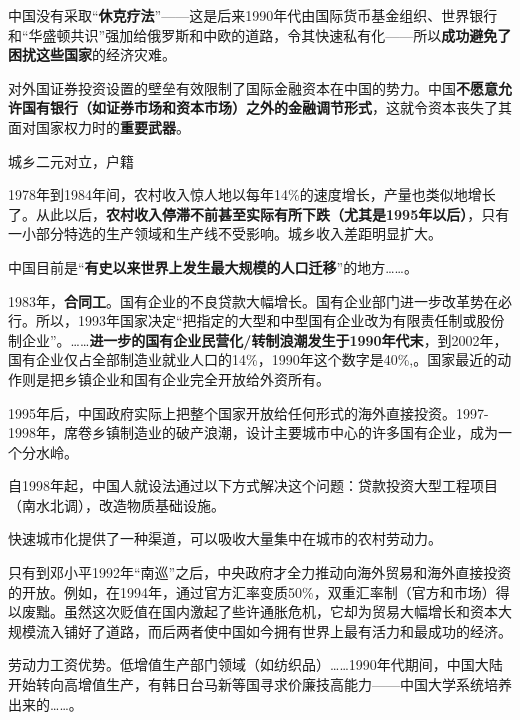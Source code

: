  中国没有采取“\textbf{休克疗法}”——这是后来1990年代由国际货币基金组织、世界银行和“华盛顿共识”强加给俄罗斯和中欧的道路，令其快速私有化——所以\textbf{成功避免了困扰这些国家}的经济灾难。

 对外国证券投资设置的壁垒有效限制了国际金融资本在中国的势力。中国\textbf{不愿意允许国有银行（如证券市场和资本市场）之外的金融调节形式}，这就令资本丧失了其面对国家权力时的\textbf{重要武器}。

城乡二元对立，户籍 

1978年到1984年间，农村收入惊人地以每年14\%的速度增长，产量也类似地增长了。从此以后，\textbf{农村收入停滞不前甚至实际有所下跌（尤其是1995年以后）}，只有一小部分特选的生产领域和生产线不受影响。城乡收入差距明显扩大。

中国目前是“\textbf{有史以来世界上发生最大规模的人口迁移}”的地方……。

1983年，\textbf{合同工}。国有企业的不良贷款大幅增长。国有企业部门进一步改革势在必行。所以，1993年国家决定“把指定的大型和中型国有企业改为有限责任制或股份制企业”。……\textbf{进一步的国有企业民营化/转制浪潮发生于1990年代末}，到2002年，国有企业仅占全部制造业就业人口的14\%，1990年这个数字是40\%,。国家最近的动作则是把乡镇企业和国有企业完全开放给外资所有。

1995年后，中国政府实际上把整个国家开放给任何形式的海外直接投资。1997-1998年，席卷乡镇制造业的破产浪潮，设计主要城市中心的许多国有企业，成为一个分水岭。

自1998年起，中国人就设法通过以下方式解决这个问题：贷款投资大型工程项目（南水北调），改造物质基础设施。

快速城市化提供了一种渠道，可以吸收大量集中在城市的农村劳动力。

只有到邓小平1992年“南巡”之后，中央政府才全力推动向海外贸易和海外直接投资的开放。例如，在1994年，通过官方汇率变质50\%，双重汇率制（官方和市场）得以废黜。虽然这次贬值在国内激起了些许通胀危机，它却为贸易大幅增长和资本大规模流入铺好了道路，而后两者使中国如今拥有世界上最有活力和最成功的经济。

劳动力工资优势。低增值生产部门领域（如纺织品）……1990年代期间，中国大陆开始转向高增值生产，有韩日台马新等国寻求价廉技高能力——中国大学系统培养出来的……。

